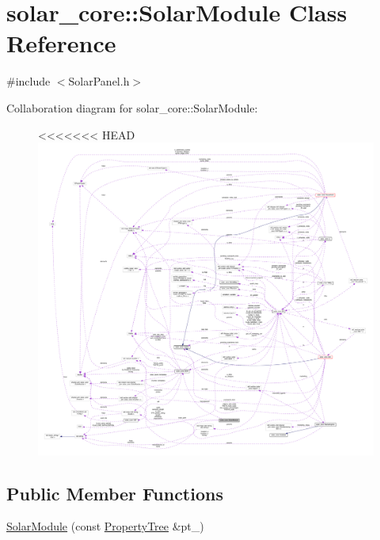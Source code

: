 \hypertarget{classsolar__core_1_1_solar_module}{}\section{solar\+\_\+core\+:\+:Solar\+Module Class Reference}
\label{classsolar__core_1_1_solar_module}


{\ttfamily \#include $<$Solar\+Panel.\+h$>$}



Collaboration diagram for solar\+\_\+core\+:\+:Solar\+Module\+:
\nopagebreak
\begin{figure}[H]
\begin{center}
\leavevmode
<<<<<<< HEAD
\includegraphics[width=350pt]{classsolar__core_1_1_solar_module__coll__graph}
\end{center}
\end{figure}
\subsection*{Public Member Functions}
\begin{DoxyCompactItemize}
\item 
\hyperlink{classsolar__core_1_1_solar_module_ae972f46a6c3bd9a1c3e7761ab1516524}{Solar\+Module} (const \hyperlink{namespacesolar__core_adeda2737d6938c190eb774a5b2495045}{Property\+Tree} \&pt\+\_\+)
\end{DoxyCompactItemize}
